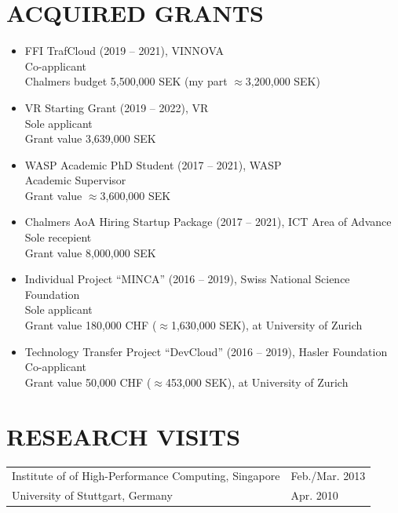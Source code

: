 \documentclass[paper=letter,fontsize=11pt]{scrartcl} %
\newcommand{\NewPart}[2]{\section*{\uppercase{#1} #2}}
\begin{document}
\NewPart{Acquired Grants}{}

\begin{itemize}
	\item FFI TrafCloud (2019 -- 2021), VINNOVA\\
	Co-applicant\\
	Chalmers budget 5,500,000 SEK (my part $\approx$3,200,000 SEK)
  \item VR Starting Grant (2019 -- 2022), VR\\
  Sole applicant\\
	Grant value 3,639,000 SEK
  \item WASP Academic PhD Student (2017 -- 2021), WASP\\
  Academic Supervisor\\
	Grant value $\approx$3,600,000 SEK
  \item Chalmers AoA Hiring Startup Package (2017 -- 2021), ICT Area of Advance\\
	Sole recepient\\
  Grant value 8,000,000 SEK
  \item Individual Project ``MINCA'' (2016 -- 2019), Swiss National Science Foundation\\
  Sole applicant \\
  Grant value 180,000 CHF ($\approx$1,630,000 SEK), at University of Zurich
  \item Technology Transfer Project ``DevCloud'' (2016 -- 2019), Hasler Foundation\\
  Co-applicant \\
  Grant value 50,000 CHF ($\approx$453,000 SEK), at University of Zurich
\end{itemize}

\NewPart{Research Visits}{}

  \begin{tabular}{p{12cm}l}
    Institute of of High-Performance Computing, Singapore & Feb./Mar. 2013 \\
    University of Stuttgart, Germany & Apr. 2010 \\
  \end{tabular}

%
%
\end{document}
